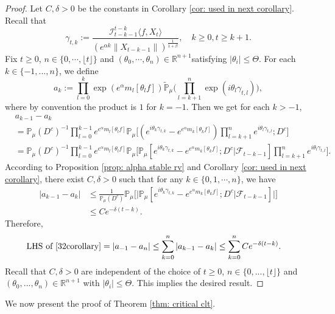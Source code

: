 \documentclass[12pt,a4paper]{amsart}
\theoremstyle{plain}
\theoremstyle{definition}
\numberwithin{equation}{section}
\begin{document}
\begin{proof}
	Let $C,\delta > 0$ be the constants in Corollary \ref{cor: used in next corollary}.
    Recall that \[\gamma_{t,k}:=\frac {\mathcal I_{t-k-1}^{t-k}\langle f ,X_t\rangle}{(e^{\alpha k}\|X_{t-k-1}\|)^\frac{1}{1+\beta}},\quad k \geq 0, t\geq k+1. \]
    Fix $t\geq 0$, $n \in \{0, \cdots, \lfloor t \rfloor\}$ and $(\theta_0, \cdots, \theta_n)\in \mathbb R^{n+1}$satisfying $|\theta_i|\leq \Theta$.
    For each $k\in\{-1,...,n\}$, we define
\[
    a_k
    :=\prod_{l=0}^{k}\exp(e^{\alpha}m_l[\theta_lf])\mathbb{\tilde{P}}_{\mu}\Big(\prod_{l=k+1}^{n}\exp\left(i\theta_l\gamma_{t,l}\right)\Big),
\]
    where by convention the product is $1$ for $k=-1$. Then we get for each $k > -1$,
\begin{align*}
    &a_{k-1} - a_k
    \\&=\mathbb{P}_{\mu}(D^c)^{-1}\prod_{l=0}^{k-1}e^{e^{\alpha}m_l[\theta_l f]}\mathbb{P}_{\mu}\Big[(e^{i\theta_{k}\gamma_{t,k}}-e^{e^{\alpha}m_k[\theta_k f]})\prod_{l=k+1}^ne^{i\theta_{l}\gamma_{t,l}};D^c\Big]
    \\&=\mathbb{P}_{\mu}(D^c)^{-1}\prod_{l=0}^{k-1}e^{e^{\alpha}m_l[\theta_l f]}\mathbb{P}_{\mu}\Big[\mathbb P_\mu[e^{i\theta_{k}\gamma_{t,k}}-e^{e^{\alpha}m_k[\theta_k f]}; D^c|\mathscr F_{t-k-1}]\prod_{l=k+1}^ne^{i\theta_{l}\gamma_{t,l}}\Big].
\end{align*}
    According to Proposition \ref{prop: alpha stable rv} and Corollary \ref{cor: used in next corollary}, there exist $C,\delta>0$ such that for any $k\in\{0, 1, \cdots, n\}$, we have
\begin{align*}
    |a_{k-1}- a_k|
    &\leq \frac{1}{\mathbb{P}_{\mu}(D^c)}\mathbb{P}_{\mu}\Big[\big|\mathbb P_\mu[e^{i\theta_{k}\gamma_{t,k}}-e^{e^{\alpha}m_k[\theta_k f]}; D^c\big|\mathscr{F}_{t-k-1}]\big|\Big]
    \\& \leq C e^{-\delta(t-k)}.
\end{align*}
    Therefore,
\begin{equation}\begin{split}
    \text{LHS of \eqref{32corollary}}&= \left|a_{-1}-a_n\right|
    \leq\sum_{k=0}^n\left|a_{k-1}-a_k\right|
    \leq \sum_{k=0}^n C e^{-\delta(t-k)}.
\end{split}\end{equation}
	Recall that $C, \delta>0$ are independent of the choice of $t\geq 0$, $n \in \{0,...,\lfloor t \rfloor\}$ and $(\theta_0,...,\theta_n)\in \mathbb R^{n+1}$ with $|\theta_i|\leq \Theta$.
    This implies the desired result.
\end{proof}
    We now present the proof of Theorem \ref{thm: critical clt}.
\bigskip
\end{document}
